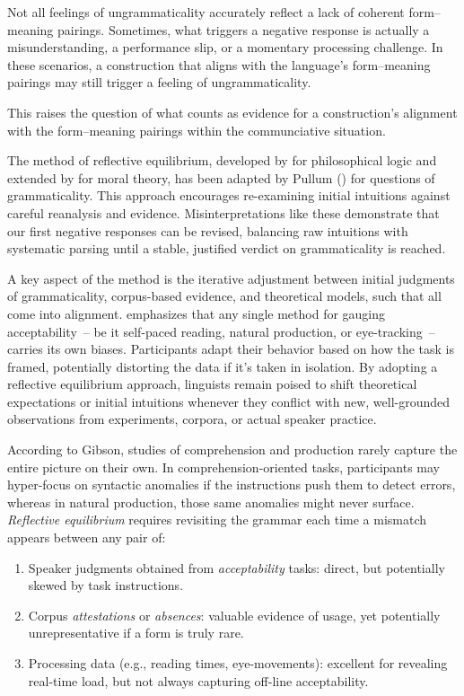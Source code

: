 Not all feelings of ungrammaticality accurately reflect a lack of coherent form--meaning pairings. Sometimes, what triggers a negative response is actually a misunderstanding, a performance slip, or a momentary processing challenge. In these scenarios, a construction that aligns with the language's form--meaning pairings may still trigger a feeling of ungrammaticality.

This raises the question of what counts as evidence for a construction's alignment with the form--meaning pairings within the communciative situation.

The method of reflective equilibrium, developed by \textcite{Goodman1955} for philosophical logic and extended by \textcite{Rawls1971} for moral theory, has been adapted by Pullum (\citeyear{Pullum2017}) for questions of grammaticality. This approach encourages re-examining initial intuitions against careful reanalysis and evidence. Misinterpretations like these demonstrate that our first negative responses can be revised, balancing raw intuitions with systematic parsing until a stable, justified verdict on grammaticality is reached.

A key aspect of the method is the iterative adjustment between initial judgments of grammaticality, corpus-based evidence, and theoretical models, such that all come into alignment. \textcite{Gibson2024} emphasizes that any single method for gauging acceptability~-- be it self-paced reading, natural production, or eye-tracking~-- carries its own biases. Participants adapt their behavior based on how the task is framed, potentially distorting the data if it's taken in isolation. By adopting a reflective equilibrium approach, linguists remain poised to shift theoretical expectations or initial intuitions whenever they conflict with new, well-grounded observations from experiments, corpora, or actual speaker practice.

According to Gibson, studies of comprehension and production rarely capture the entire picture on their own. In comprehension-oriented tasks, participants may hyper-focus on syntactic anomalies if the instructions push them to detect errors, whereas in natural production, those same anomalies might never surface. \textit{Reflective equilibrium} requires revisiting the grammar each time a mismatch appears between any pair of:
\begin{enumerate}
    \item Speaker judgments obtained from \textit{acceptability} tasks: direct, but potentially skewed by task instructions.
    \item Corpus \textit{attestations} or \textit{absences}: valuable evidence of usage, yet potentially unrepresentative if a form is truly rare.
    \item Processing data (e.g., reading times, eye-movements): excellent for revealing real-time load, but not always capturing off-line acceptability.
\end{enumerate}


